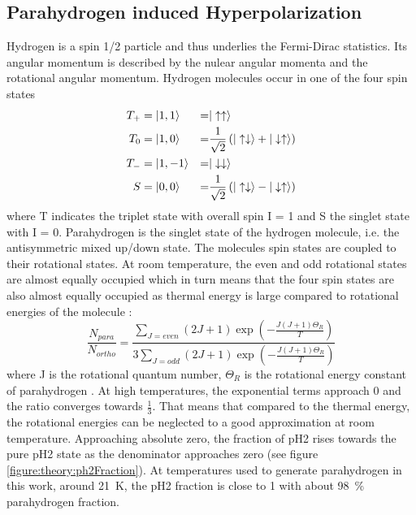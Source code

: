         \subsection{Parahydrogen induced Hyperpolarization}
            Hydrogen is a spin 1/2 particle and thus underlies the Fermi-Dirac statistics. Its angular momentum is described by the nulear angular momenta and the rotational angular momentum. Hydrogen molecules occur in one of the four spin states
            \begin{equation}
                 \begin{aligned}
                     T_+ &=\ket{1,1} & = & |\uparrow\uparrow\rangle\\
                     T_0 &= \ket{1,0} & = &\frac{1}{\sqrt{2}}\left(|\uparrow\downarrow\rangle + |\downarrow\uparrow\rangle\right)\\
                     T_- &= \ket{1,-1}& = & |\downarrow\downarrow\rangle\\
                     S &= \ket{0,0} & = &\frac{1}{\sqrt{2}}\left(|\uparrow\downarrow\rangle - |\downarrow\uparrow\rangle\right)
                 \end{aligned}
            \end{equation}
            where T indicates the triplet state with overall spin I = 1 and S the singlet state with I = 0. Parahydrogen is the singlet state of the hydrogen molecule, i.e. the antisymmetric mixed up/down state. The molecules spin states are coupled to their rotational states. At room temperature, the even and odd rotational states are almost equally occupied which in turn means that the four spin states are also almost equally occupied as thermal energy is large compared to rotational energies of the molecule \cite{green_theory_2012-1}:
            \begin{equation}
                \frac{N_{para}}{N_{ortho}} = \frac{\sum_{J=even}(2J+1)\exp\left(-\frac{J(J+1)\Theta_R}{T}\right)}{3\sum_{J=odd}\left(2J+1\right)\exp\left(-\frac{J(J+1)\Theta_R}{T}\right)}
            \end{equation}
            where J is the rotational quantum number, $\Theta_R$ is the rotational energy constant of parahydrogen \cite{noauthor_orthohydrogen_1935}. At high temperatures, the exponential terms approach 0 and the ratio converges towards $\tfrac{1}{3}$. That means that compared to the thermal energy, the rotational energies can be neglected to a good approximation at room temperature. Approaching absolute zero, the fraction of pH2 rises towards the pure pH2 state as the denominator approaches zero (see figure \ref{figure:theory:ph2Fraction}). At temperatures used to generate parahydrogen in this work, around \SI{21}{\kelvin}, the pH2 fraction is close to 1 with about \SI{98}{\percent} parahydrogen fraction.
